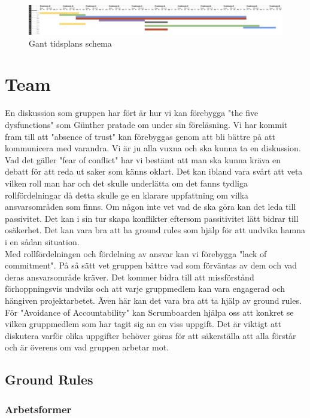 \documentclass[12pt]{article}
\begin{document}
\begin{figure}[htp]
    \centering
    \includegraphics[width = 450px]{Gantt2.png}
    \caption{Gant tidsplans schema}
    \label{fig:Gant tidsplans schema}
\end{figure}
\newpage
\section{Team}

En diskussion som gruppen har fört är hur vi kan förebygga "the five dysfunctions" som Günther pratade om under sin föreläsning. Vi har
kommit fram till att "absence of trust" kan förebyggas genom att bli bättre på att kommunicera med varandra. Vi är ju alla vuxna och ska kunna ta en diskussion. Vad det gäller "fear of conflict" har vi
bestämt att man ska kunna kräva en debatt för att reda ut saker som känns oklart. Det kan ibland
vara svårt att veta vilken roll man har och det skulle underlätta om det fanns tydliga
rollfördelningar då detta skulle ge en klarare uppfattning om vilka ansvarsområden som finns. Om någon inte vet vad de ska
göra kan det leda till passivitet. Det kan i sin tur skapa konflikter eftersom passitivitet lätt bidrar till osäkerhet. Det kan vara bra att ha ground rules som hjälp för att undvika hamna i en
sådan situation. \\
Med rollfördelningen och fördelning av ansvar kan vi förebygga "lack of
commitment". På så sätt vet gruppen bättre vad som förväntas av dem och vad deras ansvarsområde kräver. Det kommer bidra till att missförstånd förhoppningsvis undviks och att
varje gruppmedlem kan vara engagerad och hängiven projektarbetet. Även här kan det vara bra
att ta hjälp av ground rules. För "Avoidance of Accountability" kan Scrumboarden hjälpa oss att
konkret se vilken gruppmedlem som har tagit sig an en viss uppgift. Det är viktigt att diskutera
varför olika uppgifter behöver göras för att säkerställa att alla förstår och är överens om vad
gruppen arbetar mot.


\subsection{Ground Rules}

\subsubsection{Arbetsformer}
\end{document}
